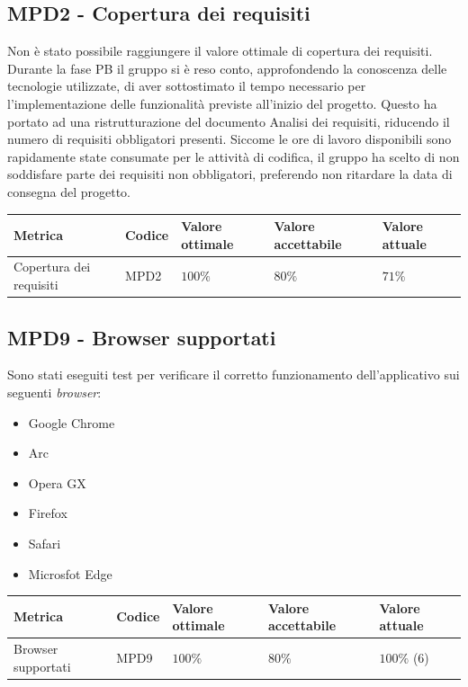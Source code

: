 \subsection{MPD2 - Copertura dei requisiti}
Non è stato possibile raggiungere il valore ottimale di copertura dei requisiti.\\
Durante la fase PB il gruppo si è reso conto, approfondendo la conoscenza delle tecnologie utilizzate, di aver sottostimato il tempo necessario per l'implementazione delle funzionalità previste all'inizio del progetto.
Questo ha portato ad una ristrutturazione del documento Analisi dei requisiti, riducendo il numero di requisiti obbligatori presenti.
Siccome le ore di lavoro disponibili sono rapidamente state consumate per le attività di codifica, il gruppo ha scelto di non soddisfare parte dei requisiti non obbligatori, preferendo non ritardare la data di consegna del progetto.
\label{s:mpd2}
\begin{table}[H]
    \centering
    \begin{tabularx}{\textwidth}{X|X|l|l|l}
        \hline
        \textbf{Metrica}        & \textbf{Codice} & \textbf{Valore ottimale} & \textbf{Valore accettabile} & \textbf{Valore attuale} \\
        \hline
        Copertura dei requisiti & MPD2            & $100\%$                  & $80\%$                      & $71\%$                \\
        \hline
    \end{tabularx}
\end{table}


\subsection{MPD9 - Browser supportati}
\label{s:mpd9}
Sono stati eseguiti test per verificare il corretto funzionamento dell'applicativo sui seguenti \textit{browser}:
\begin{itemize}
    \item Google Chrome
    \item Arc
    \item Opera GX
    \item Firefox
    \item Safari
    \item Microsfot Edge
\end{itemize}

\vspace{0.5cm}
\begin{table}[H]
    \centering
    \begin{tabularx}{\textwidth}{X|X|l|l|l}
        \hline
        \textbf{Metrica}   & \textbf{Codice} & \textbf{Valore ottimale} & \textbf{Valore accettabile} & \textbf{Valore attuale} \\
        \hline
        Browser supportati & MPD9            & $100\%$                  & $80\%$                      & $100\%$ (6)               \\
        \hline
    \end{tabularx}
\end{table}
